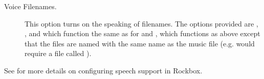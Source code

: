 \begin{description}
  \item[Voice Filenames.]
    This option turns on the speaking of filenames.  The options provided
    are , , and  which function 
    the same as for  and ,
    which functions as above except that the files are named with the same
    name as the music file (e.g.  would require a
    file called ).

  \end{description}

See  for more details on configuring speech support in Rockbox.
